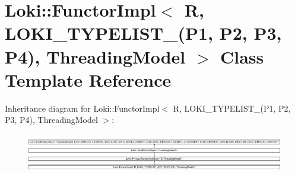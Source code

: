 \hypertarget{classLoki_1_1FunctorImpl_3_01R_00_01LOKI__TYPELIST__4_07P1_00_01P2_00_01P3_00_01P4_08_00_01ThreadingModel_01_4}{}\section{Loki\+:\+:Functor\+Impl$<$ R, L\+O\+K\+I\+\_\+\+T\+Y\+P\+E\+L\+I\+S\+T\+\_(P1, P2, P3, P4), Threading\+Model $>$ Class Template Reference}
\label{classLoki_1_1FunctorImpl_3_01R_00_01LOKI__TYPELIST__4_07P1_00_01P2_00_01P3_00_01P4_08_00_01ThreadingModel_01_4}
Inheritance diagram for Loki\+:\+:Functor\+Impl$<$ R, L\+O\+K\+I\+\_\+\+T\+Y\+P\+E\+L\+I\+S\+T\+\_(P1, P2, P3, P4), Threading\+Model $>$\+:\begin{figure}[H]
\begin{center}
\leavevmode
\includegraphics[height=1.751368cm]{classLoki_1_1FunctorImpl_3_01R_00_01LOKI__TYPELIST__4_07P1_00_01P2_00_01P3_00_01P4_08_00_01ThreadingModel_01_4}
\end{center}
\end{figure}
